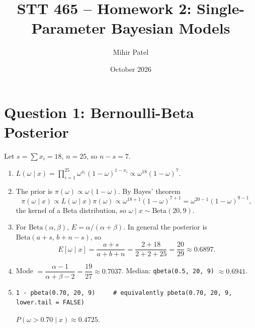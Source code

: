 \documentclass[11pt]{article}
\title{STT 465 -- Homework 2: Single-Parameter Bayesian Models}
\author{Mihir Patel}
\date{October 2026}
\begin{document}
\maketitle

\section*{Question 1: Bernoulli-Beta Posterior}
Let $s=\sum x_i = 18$, $n=25$, so $n-s=7$.
\begin{enumerate}
\item $L(\omega\mid x)=\prod_{i=1}^{25}\omega^{x_i}(1-\omega)^{1-x_i}\propto \omega^{18}(1-\omega)^{7}.$

\item The prior is $\pi(\omega)\propto\omega(1-\omega)$. By Bayes' theorem
\[
\pi(\omega\mid x)\propto L(\omega\mid x)\pi(\omega)\propto\omega^{18+1}(1-\omega)^{7+1}=\omega^{20-1}(1-\omega)^{9-1},
\]
the kernel of a Beta distribution, so $\omega\mid x\sim \mathrm{Beta}(20,9)$.

\item For $\mathrm{Beta}(\alpha,\beta)$, $E=\alpha/(\alpha+\beta)$. In general the posterior is $\mathrm{Beta}(a+s,\,b+n-s)$, so
\[
E[\omega\mid x]=\frac{a+s}{a+b+n}=\frac{2+18}{2+2+25}=\frac{20}{29}\approx 0.6897.
\]

\item Mode $=\dfrac{\alpha-1}{\alpha+\beta-2}=\dfrac{19}{27}\approx 0.7037$. Median: \texttt{qbeta(0.5, 20, 9)} $\approx 0.6941$.

\item \begin{lstlisting}
1 - pbeta(0.70, 20, 9)     # equivalently pbeta(0.70, 20, 9, lower.tail = FALSE)
\end{lstlisting}
$P(\omega>0.70\mid x)\approx 0.4725$.
\end{enumerate}

\end{document}
